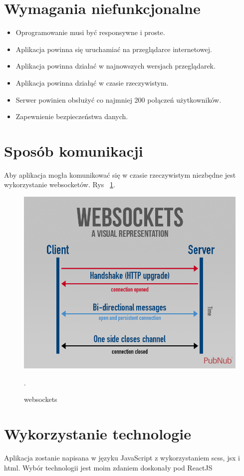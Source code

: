 \section{Wymagania niefunkcjonalne}

\begin{itemize}
    \item Oprogramowanie musi być responsywne i proste.
    \item Aplikacja powinna się uruchamiać na przeglądarce internetowej.
    \item Aplikacja powinna działać w najnowszych wersjach przeglądarek.
    \item Aplikacja powinna działąć w czasie rzeczywistym.
    \item Serwer powinien obsłużyć  co najmniej 200 połączeń użytkowników.
    \item Zapewnienie bezpieczeństwa danych.
\end{itemize}

\section{Sposób komunikacji}

Aby aplikacja mogła komunikować się w czasie rzeczywistym niezbędne jest wykorzystanie websocketów. Rys
~\ref{rys:websocket}.

\begin{figure}[H]
	\centering\includegraphics[width=.6\textwidth]{img/websocket}
	\caption{websockets}.
	\label{rys:websocket}
\end{figure}

\section{Wykorzystanie technologie}

Aplikacja zostanie napisana w języku JavaScript z wykorzystaniem scss, jsx i html.
Wybór technologii jest moim zdaniem doskonały pod ReactJS

